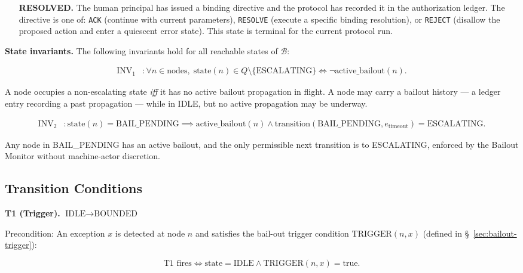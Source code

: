 \begin{itemize}
\item[\textbf{RESOLVED.}] The human principal has issued a binding directive and the protocol has recorded it in the authorization ledger. The directive is one of: \texttt{ACK} (continue with current parameters), \texttt{RESOLVE} (execute a specific binding resolution), or \texttt{REJECT} (disallow the proposed action and enter a quiescent error state). This state is terminal for the current protocol run.
\end{itemize}

\bigskip
\noindent\textbf{State invariants.} The following invariants hold for all reachable states of $\mathcal{B}$:

\begin{align}
\text{INV}_1 &: \forall n \in \text{nodes},\; \text{state}(n) \in Q \setminus \{\text{ESCALATING}\} \iff \neg\text{active\_bailout}(n). \tag{INV-1}
\end{align}

A node occupies a non-escalating state \emph{iff} it has no active bailout propagation in flight. A node may carry a bailout history — a ledger entry recording a past propagation — while in IDLE, but no active propagation may be underway.

\begin{align}
\text{INV}_2 &: \text{state}(n) = \text{BAIL\_PENDING} \implies \text{active\_bailout}(n) \land \text{transition}(\text{BAIL\_PENDING}, e_{\text{timeout}}) = \text{ESCALATING}. \tag{INV-2}
\end{align}

Any node in BAIL\_PENDING has an active bailout, and the only permissible next transition is to ESCALATING, enforced by the Bailout Monitor without machine-actor discretion.

\subsection{Transition Conditions}\label{sec:transition-conditions}

\textbf{T1 (Trigger).} $\text{IDLE} \rightarrow \text{BOUNDED}$

Precondition: An exception $x$ is detected at node $n$ and satisfies the bail-out trigger condition $\text{TRIGGER}(n, x)$ (defined in \S~\ref{sec:bailout-trigger}):

\begin{equation}
\text{T1 fires} \iff \text{state} = \text{IDLE} \land \text{TRIGGER}(n, x) = \text{true}. \tag{T1}
\end{equation}

